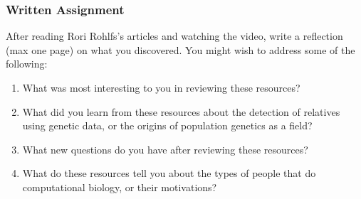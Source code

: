 \documentclass{article}
\begin{document}
\subsubsection*{Written Assignment} 
After reading Rori Rohlfs's articles and watching the video, write a reflection (max one page) on what you discovered. You might wish to address some of the following: 

\begin{enumerate}
\item What was most interesting to you in reviewing these resources?
\item What did you learn from these resources about the detection of relatives using genetic data, or the origins of population genetics as a field?
\item What new questions do you have after reviewing these resources?
\item What do these resources tell you about the types of people that do computational biology, or their motivations?
\end{enumerate}

\EndAccSupp{}
\end{document}

